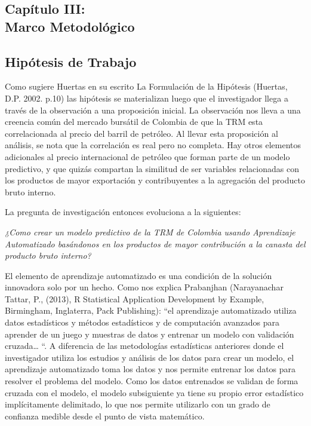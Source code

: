 \begin{spacing}{1.5}
\setcounter{chapter}{2}
\chapter{Capítulo III: \\Marco Metodológico}
\thispagestyle{empty}

\section{Hipótesis de Trabajo }
Como sugiere Huertas en su escrito La Formulación de la Hipótesis (Huertas, D.P. 2002. p.10) las hipótesis se materializan luego que el investigador llega a través de la observación a una proposición inicial. La observación nos lleva a una creencia común del mercado bursátil de Colombia de que la TRM esta correlacionada al precio del barril de petróleo. Al llevar esta proposición al análisis, se nota que la correlación es real pero no completa. Hay otros elementos adicionales al precio internacional de petróleo que forman parte de un modelo predictivo, y que quizás compartan la similitud de ser variables relacionadas con los productos de mayor exportación y contribuyentes a la agregación del producto bruto interno.

La pregunta de investigación entonces evoluciona a la siguientes:

\emph{¿Como crear un modelo predictivo de la TRM de Colombia usando Aprendizaje Automatizado basándonos en los productos de mayor contribución a la canasta del producto bruto interno?}

El elemento de aprendizaje automatizado es una condición de la solución innovadora solo por un hecho. Como nos explica Prabanjhan (Narayanachar Tattar, P., (2013), R Statistical Application Development by Example, Birmingham, Inglaterra, Pack Publishing): “el aprendizaje automatizado utiliza datos estadísticos y métodos estadísticos y de computación avanzados para aprender de un juego y muestras de datos y entrenar un modelo con validación cruzada… “. A diferencia de las metodologías estadísticas anteriores donde el investigador utiliza los estudios y análisis de los datos para crear un modelo, el aprendizaje automatizado toma los datos y nos permite entrenar los datos para resolver el problema del modelo. Como los datos entrenados se validan de forma cruzada con el modelo, el modelo subsiguiente ya tiene su propio error estadístico implícitamente delimitado, lo que nos permite utilizarlo con un grado de confianza medible desde el punto de vista matemático.


\end{spacing}
